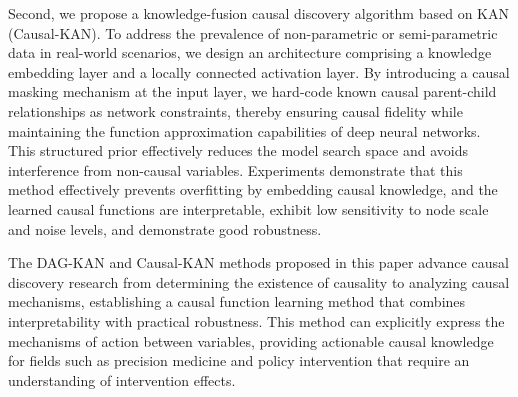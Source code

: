 \begin{eabstract}
Second, we propose a knowledge-fusion causal discovery algorithm based on KAN (Causal-KAN). To address the prevalence of non-parametric or semi-parametric data in real-world scenarios, we design an architecture comprising a knowledge embedding layer and a locally connected activation layer. By introducing a causal masking mechanism at the input layer, we hard-code known causal parent-child relationships as network constraints, thereby ensuring causal fidelity while maintaining the function approximation capabilities of deep neural networks. This structured prior effectively reduces the model search space and avoids interference from non-causal variables. Experiments demonstrate that this method effectively prevents overfitting by embedding causal knowledge, and the learned causal functions are interpretable, exhibit low sensitivity to node scale and noise levels, and demonstrate good robustness.

The DAG-KAN and Causal-KAN methods proposed in this paper advance causal discovery research from determining the existence of causality to analyzing causal mechanisms, establishing a causal function learning method that combines interpretability with practical robustness. This method can explicitly express the mechanisms of action between variables, providing actionable causal knowledge for fields such as precision medicine and policy intervention that require an understanding of intervention effects.

\end{eabstract}

